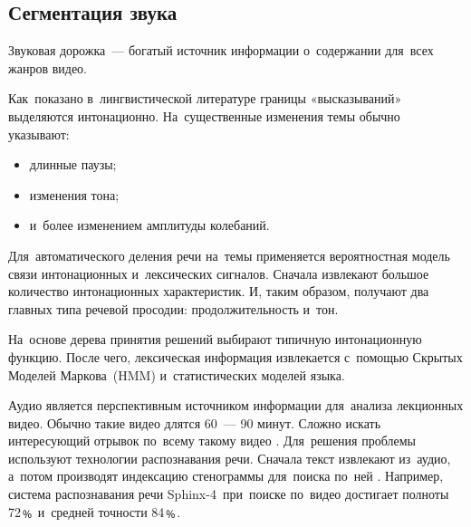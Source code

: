 \subsection{Сегментация звука}

Звуковая дорожка~— богатый источник информации
о~содержании для~всех жанров видео.

Как~показано в~лингвистической литературе границы «высказываний»
выделяются интонационно.
На~существенные изменения темы обычно указывают:
\begin{itemize}
    \item длинные паузы;
    \item изменения тона;
    \item и~более изменением амплитуды колебаний.
\end{itemize}

Для~автоматического деления речи на~темы
применяется вероятностная модель связи интонационных
и~лексических сигналов.
Сначала извлекают большое количество интонационных характеристик.
И, таким образом, получают два главных типа речевой просодии:
продолжительность и~тон.

На~основе дерева принятия решений выбирают
типичную интонационную функцию.
После чего, лексическая информация извлекается
с~помощью Скрытых Моделей
Маркова\ (HMM)
и~статистических моделей языка.

Аудио является перспективным источником информации
для~анализа лекционных видео.
Обычно такие видео длятся 60~— 90 минут.
Сложно искать интересующий отрывок по~всему такому видео \cite{Repp:2008}.
Для~решения проблемы используют технологии
распознавания речи.
Сначала текст извлекают из~аудио,
а~потом производят индексацию стенограммы для~поиска по~ней \cite{Kumar:2011}.
Например, система распознавания речи Sphinx-4\ при~поиске
по~видео достигает полноты 72﹪ и~средней точности 84﹪.

